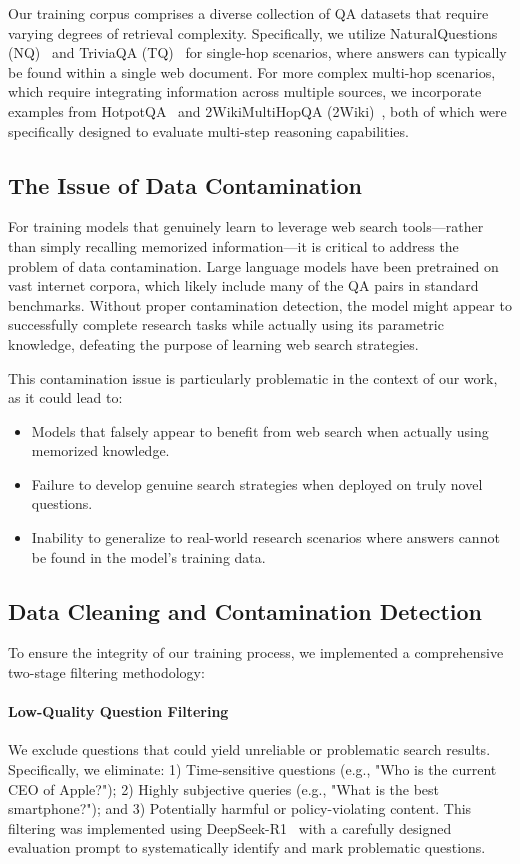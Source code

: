 \documentclass{article}
\begin{document}
Our training corpus comprises a diverse collection of QA datasets that require varying degrees of retrieval complexity. Specifically, we utilize NaturalQuestions (NQ)~\cite{kwiatkowski-etal-2019-natural} and TriviaQA (TQ)~\cite{joshi-etal-2017-triviaqa} for single-hop scenarios, where answers can typically be found within a single web document. For more complex multi-hop scenarios, which require integrating information across multiple sources, we incorporate examples from HotpotQA~\cite{yang2018hotpotqa} and 2WikiMultiHopQA (2Wiki)~\cite{xanh2020_2wikimultihop}, both of which were specifically designed to evaluate multi-step reasoning capabilities.

\subsection{The Issue of Data Contamination}
For training models that genuinely learn to leverage web search tools—rather than simply recalling memorized information—it is critical to address the problem of data contamination. Large language models have been pretrained on vast internet corpora, which likely include many of the QA pairs in standard benchmarks. Without proper contamination detection, the model might appear to successfully complete research tasks while actually using its parametric knowledge, defeating the purpose of learning web search strategies.

This contamination issue is particularly problematic in the context of our work, as it could lead to:
\begin{itemize}
\item Models that falsely appear to benefit from web search when actually using memorized knowledge.
\item Failure to develop genuine search strategies when deployed on truly novel questions.
\item Inability to generalize to real-world research scenarios where answers cannot be found in the model's training data.
\end{itemize}

\subsection{Data Cleaning and Contamination Detection}
To ensure the integrity of our training process, we implemented a comprehensive two-stage filtering methodology:

\paragraph{Low-Quality Question Filtering} We exclude questions that could yield unreliable or problematic search results. Specifically, we eliminate: 1) Time-sensitive questions (e.g., "Who is the current CEO of Apple?"); 2) Highly subjective queries (e.g., "What is the best smartphone?"); and 3) Potentially harmful or policy-violating content. This filtering was implemented using DeepSeek-R1~\cite{guo2025deepseek} with a carefully designed evaluation prompt to systematically identify and mark problematic questions.
\end{document}
